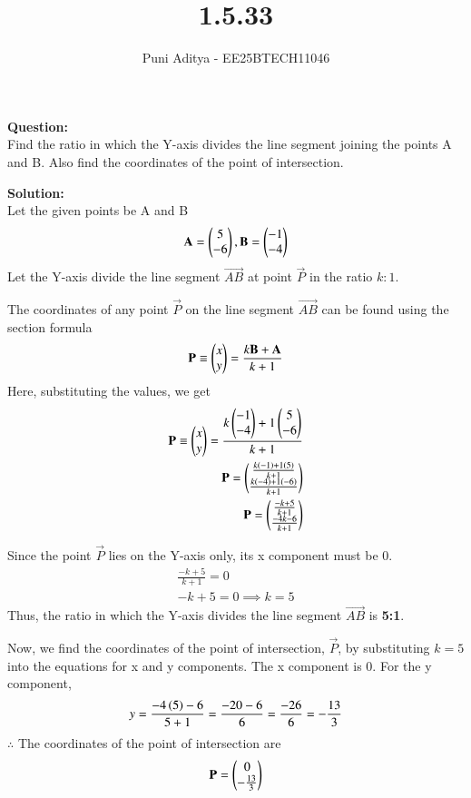 \documentclass[journal]{IEEEtran}
\begin{document}
\title{1.5.33}
\author{Puni Aditya - EE25BTECH11046}
\maketitle

\textbf{Question:}\\
Find the ratio in which the Y-axis divides the line segment joining the points A and B. Also find the coordinates of the point of intersection.

\textbf{Solution:}\\
Let the given points be A and B
\begin{align*} \mathbf{A} = \begin{pmatrix}5 \\ -6\end{pmatrix}, \mathbf{B} = \begin{pmatrix}-1 \\ -4\end{pmatrix} \end{align*}
Let the Y-axis divide the line segment $\vec{AB}$ at point $\vec{P}$ in the ratio $k:1$.

The coordinates of any point $\vec{P}$ on the line segment $\vec{AB}$ can be found using the section formula
\begin{align}
    \mathbf{P} \equiv \begin{pmatrix}x \\ y\end{pmatrix} = \frac{k\mathbf{B} + \mathbf{A}}{k+1}
\end{align}
Here, substituting the values, we get
\begin{align}
    \mathbf{P} \equiv \begin{pmatrix}x \\ y\end{pmatrix} = \frac{k\begin{pmatrix}-1 \\ -4\end{pmatrix}+1\begin{pmatrix}5 \\ -6\end{pmatrix}}{k+1} \\
    \mathbf{P} = \begin{pmatrix}\frac{k\left(-1\right) + 1\left(5\right)}{k+1} \\ \frac{k\left(-4\right) + 1\left(-6\right)}{k+1}\end{pmatrix} \\
    \mathbf{P} = \begin{pmatrix}\frac{-k+5}{k+1} \\ \frac{-4k-6}{k+1}\end{pmatrix}
\end{align}

Since the point $\vec{P}$ lies on the Y-axis only, its x component must be 0.
\begin{align}
    \frac{-k+5}{k+1} = 0 \\
    -k + 5 = 0 \implies k = 5
\end{align}
Thus, the ratio in which the Y-axis divides the line segment $\vec{AB}$ is \textbf{5:1}.

Now, we find the coordinates of the point of intersection, $\vec{P}$, by substituting $k=5$ into the equations for x and y components.
The x component is 0. For the y component,
\begin{align}
    y = \frac{-4\left(5\right) - 6}{5+1} = \frac{-20 - 6}{6} = \frac{-26}{6} = -\frac{13}{3}
\end{align}
$\therefore$ The coordinates of the point of intersection are 
\begin{align*}
\mathbf{P} = \begin{pmatrix}0 \\ -\frac{13}{3}\end{pmatrix}
\end{align*}
\end{document}
